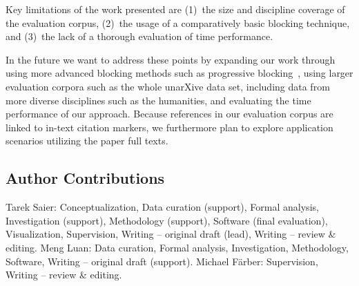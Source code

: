 Key limitations of the work presented are (1)~the size and discipline coverage of the evaluation corpus, (2)~the usage of a comparatively basic blocking technique, and (3)~the lack of a thorough evaluation of time performance.

In the future we want to address these points by expanding our work through using more advanced blocking methods such as progressive blocking~\cite{Simonini2019,Galhotra2021}, using larger evaluation corpora such as the whole unarXive data set, including data from more diverse disciplines such as the humanities, and evaluating the time performance of our approach.
Because references in our evaluation corpus are linked to in-text citation markers, we furthermore plan to explore application scenarios utilizing the paper full texts. %


\subsection*{Author Contributions}  %
Tarek Saier: Conceptualization, Data curation (support), Formal analysis, Investigation (support), Methodology (support), Software (final evaluation), Visualization, Supervision, Writing -- original draft (lead), Writing -- review \& editing. Meng Luan: Data curation, Formal analysis, Investigation, Methodology, Software, Writing -- original draft (support). Michael F{\"a}rber: Supervision, Writing -- review \& editing.



